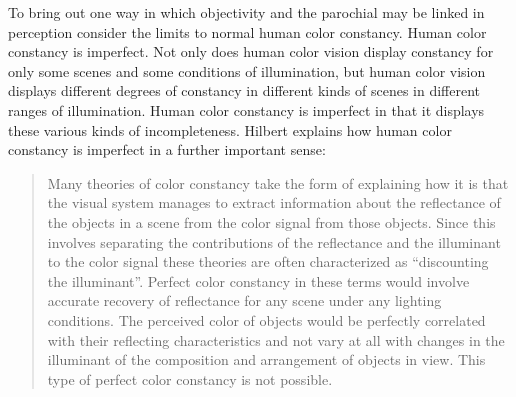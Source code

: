 To bring out one way in which objectivity and the parochial may be linked in perception consider the limits to normal human color constancy. Human color constancy is imperfect. Not only does human color vision display constancy for only some scenes and some conditions of illumination, but human color vision displays different degrees of constancy in different kinds of scenes in different ranges of illumination. Human color constancy is imperfect in that it displays these various kinds of incompleteness. Hilbert explains how human color constancy is imperfect in a further important sense:
	\begin{quote}
		Many theories of color constancy take the form of explaining how it is that the visual system manages to extract information about the reflectance of the objects in a scene from the color signal from those objects. Since this involves separating the contributions of the reflectance and the illuminant to the color signal these theories are often characterized as ``discounting the illuminant''. Perfect color constancy in these terms would involve accurate recovery of reflectance for any scene under any lighting conditions. The perceived color of objects would be perfectly correlated with their reflecting characteristics and not vary at all with changes in the illuminant of the composition and arrangement of objects in view. This type of perfect color constancy is not possible. \citep[143]{Hilbert:2007qy}
	\end{quote}

